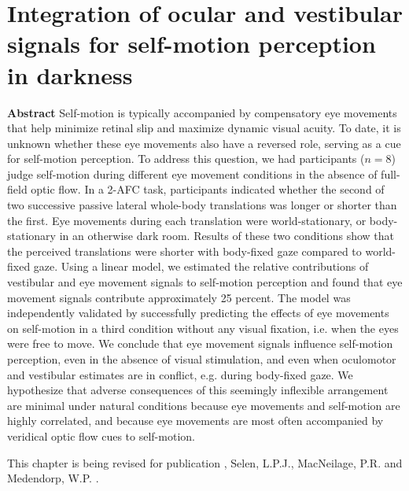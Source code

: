 
\thispagestyle{empty}

\chapter{Integration of ocular and vestibular signals for self-motion perception in darkness}
\chaptermark{}

\newpage

\small {\bf Abstract} Self-motion is typically accompanied by compensatory eye movements that help minimize retinal slip and maximize dynamic visual acuity. To date, it is unknown whether these eye movements also have a reversed role, serving as a cue for self-motion perception. To address this question, we had participants ($n=8$) judge self-motion during different eye movement conditions in the absence of full-field optic flow.  In a 2-AFC task, participants indicated whether the second of two successive passive lateral whole-body translations was longer or shorter than the first. Eye movements during each translation were world-stationary, or body-stationary in an otherwise dark room. Results of these two conditions show that the perceived translations were shorter with body-fixed gaze compared to world-fixed gaze. Using a linear model, we estimated the relative contributions of vestibular and eye movement signals to self-motion perception and found that eye movement signals contribute approximately 25 percent. The model was independently validated by successfully predicting the effects of eye movements on self-motion in a third condition without any visual fixation, i.e. when the eyes were free to move. We conclude that eye movement signals influence self-motion perception, even in the absence of visual stimulation, and even when oculomotor and vestibular estimates are in conflict, e.g. during body-fixed gaze. We hypothesize that adverse consequences of this seemingly inflexible arrangement are minimal under natural conditions because eye movements and self-motion are highly correlated, and because eye movements are most often accompanied by veridical optic flow cues to self-motion.

\vfill

\noindent\underline{ \hspace{4cm} }

\noindent This chapter is being revised for publication \newline
{}, Selen, L.P.J., MacNeilage, P.R. and Medendorp, W.P. \citeyear{clemens2015a}. %

\newpage





